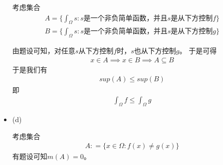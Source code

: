 \documentclass{article}
\begin{document}
\begin{itemize}
        考虑集合
        \begin{align*}
          A = \{\int_{\Omega} s: s \text{是一个非负简单函数，并且$s$是从下方控制$f$}\} \\
          B = \{\int_{\Omega} s: s \text{是一个非负简单函数，并且$s$是从下方控制$g$}\}
        \end{align*}

        由题设可知，对任意$s$从下方控制$f$时，$s$也从下方控制$g$。
        于是可得
        \begin{align*}
          x \in A
          \implies
          x \in B
          \implies
          A \subseteq B
        \end{align*}
        于是我们有
        \begin{align*}
          sup(A) \leq sup(B)
        \end{align*}
        即
        \begin{align*}
          \int_{\Omega} f \leq \int_{\Omega} g
        \end{align*}
  \item (d)

        考虑集合
        \begin{align*}
          A : = \{x \in \Omega : f(x) \neq g(x)\}
        \end{align*}
        有题设可知$m(A) = 0$。


\end{itemize}
\end{document}
